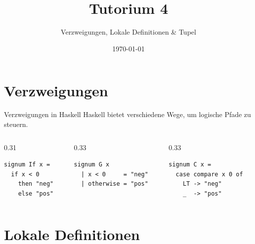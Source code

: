 \documentclass[aspectratio=169,11pt]{beamer}
\title{\textbf{Tutorium 4}}
\subtitle{Verzweigungen, Lokale Definitionen \& Tupel}
\institute{Grundlagen der Praktischen Informatik}
\author{}
\date{\today}
\begin{document}
\begin{frame}[plain]
    \titlepage
\end{frame}

\section{Verzweigungen}

\begin{frame}[fragile]{Verzweigungen in Haskell}
    Haskell bietet verschiedene Wege, um logische Pfade zu steuern.
    
    \begin{columns}[T]
        \begin{column}{0.31\textwidth}
            \begin{tcolorbox}[modernbox, title=\texttt{if-then-else}]
\begin{lstlisting}
signum If x =
  if x < 0
    then "neg"
    else "pos"
\end{lstlisting}
            \end{tcolorbox}
        \end{column}
        
        \begin{column}{0.33\textwidth}
            \begin{tcolorbox}[modernbox, title=Guards (\texttt{|})]
\begin{lstlisting}
signum G x
  | x < 0     = "neg"
  | otherwise = "pos"
\end{lstlisting}
            \end{tcolorbox}
        \end{column}

        \begin{column}{0.33\textwidth}
            \begin{tcolorbox}[modernbox, title=\texttt{case-of}]
\begin{lstlisting}
signum C x = 
  case compare x 0 of
    LT -> "neg"
    _  -> "pos"
\end{lstlisting}
            \end{tcolorbox}
        \end{column}
    \end{columns}
\end{frame}

\section{Lokale Definitionen}
\end{document}
